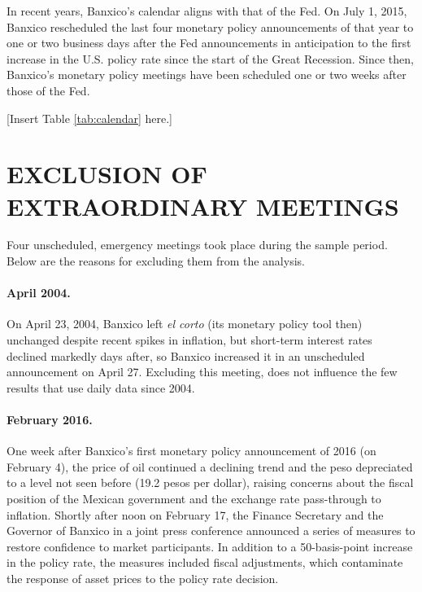 \documentclass[a4paper,12pt]{article} 		%
\begin{document}
\begin{appendices}
In recent years, Banxico's calendar aligns with that of the Fed. On July 1, 2015, Banxico rescheduled the last four monetary policy announcements of that year to one or two business days after the Fed announcements in anticipation to the first increase in the U.S. policy rate since the start of the Great Recession. Since then, Banxico's monetary policy meetings have been scheduled one or two weeks after those of the Fed.

\begin{center}
	[Insert Table \ref{tab:calendar} here.]
\end{center}

\sectitlespace
\section{EXCLUSION OF EXTRAORDINARY MEETINGS} \label{sec:exclusions}
\sectitlespace

Four unscheduled, emergency meetings took place during the sample period. Below are the reasons for excluding them from the analysis. 

\paragraph{April 2004.} On April 23, 2004, Banxico left \textit{el corto} (its monetary policy tool then) unchanged despite recent spikes in inflation, but short-term interest rates declined markedly days after, so Banxico increased it in an unscheduled announcement on April 27. Excluding this meeting, does not influence the few results that use daily data since 2004. 

\paragraph{February 2016.} One week after Banxico's first monetary policy announcement of 2016 (on February 4), the price of oil continued a declining trend and the peso depreciated to a level not seen before (19.2 pesos per dollar), raising concerns about the fiscal position of the Mexican government and the exchange rate pass-through to inflation.
Shortly after noon on February 17, the Finance Secretary and the Governor of Banxico in a joint press conference announced a series of measures to restore confidence to market participants. In addition to a 50-basis-point increase in the policy rate, the measures included fiscal adjustments, which contaminate the response of asset prices to the policy rate decision. 


\end{appendices}
\end{document}
